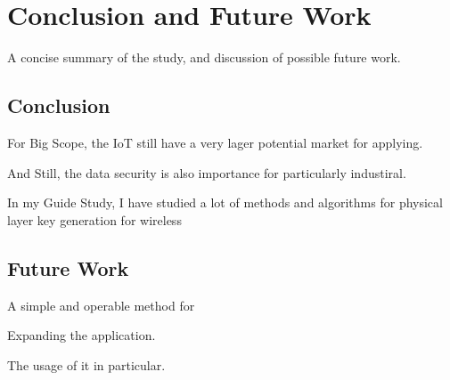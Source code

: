 
\chapter{Conclusion and Future Work}
A concise summary of the study, and discussion of possible future work.

\section{Conclusion}
For Big Scope, the IoT still have a very lager potential market for applying.

And Still, the data security is also importance for particularly industiral.

In my Guide Study, I have studied a lot of methods and algorithms for physical layer key generation for wireless 


\section{Future Work}
A simple and operable method for 

Expanding the application.

The usage of it in particular.